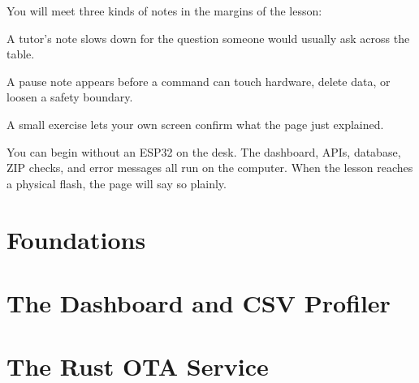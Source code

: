 \documentclass[11pt,letterpaper,openany]{book}
\begin{document}
You will meet three kinds of notes in the margins of the lesson:

\begin{mentorbox}
A tutor's note slows down for the question someone would usually ask across the table.
\end{mentorbox}

\begin{warningbox}
A pause note appears before a command can touch hardware, delete data, or loosen a safety boundary.
\end{warningbox}

\begin{checkpoint}
A small exercise lets your own screen confirm what the page just explained.
\end{checkpoint}

You can begin without an ESP32 on the desk. The dashboard, APIs, database, ZIP checks, and error messages all run on the computer. When the lesson reaches a physical flash, the page will say so plainly.
\clearpage

\tableofcontents

\mainmatter

\part{Foundations}



\part{The Dashboard and CSV Profiler}



\part{The Rust OTA Service}


\end{document}
